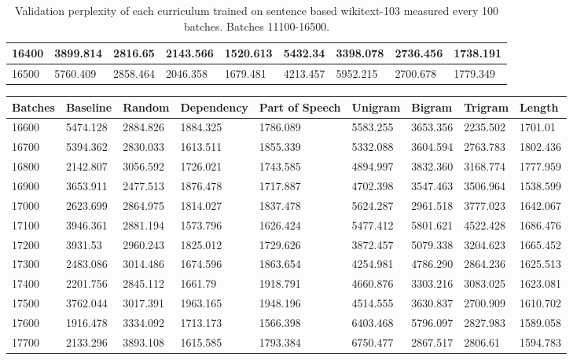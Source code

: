 \documentclass [11pt, proquest] {uwthesis}[2020/12/20]
\begin{document}
\begin{table}[]
\begin{tiny}
\begin{tabular}{|l|l|l|l|l|l|l|l|l|}
16400 & 3899.814 & 2816.65 & 2143.566 & 1520.613 & 5432.34 & 3398.078 & 2736.456 & 1738.191 \\ \hline
16500 & 5760.409 & 2858.464 & 2046.358 & 1679.481 & 4213.457 & 5952.215 & 2700.678 & 1779.349 \\ \hline
\end{tabular}
\end{tiny}
\caption{Validation perplexity of each curriculum trained on sentence based wikitext-103 measured every 100 batches. Batches 11100-16500.}
\label{tab:wikitext-103-sentence-3}
\end{table}
\begin{table}[]
\centering
\begin{tiny}
\begin{tabular}{|l|l|l|l|l|l|l|l|l|}
\hline
Batches & Baseline & Random & Dependency & Part of Speech & Unigram & Bigram & Trigram & Length \\ \hline
16600 & 5474.128 & 2884.826 & 1884.325 & 1786.089 & 5583.255 & 3653.356 & 2235.502 & 1701.01 \\ \hline
16700 & 5394.362 & 2830.033 & 1613.511 & 1855.339 & 5332.088 & 3604.594 & 2763.783 & 1802.436 \\ \hline
16800 & 2142.807 & 3056.592 & 1726.021 & 1743.585 & 4894.997 & 3832.360 & 3168.774 & 1777.959 \\ \hline
16900 & 3653.911 & 2477.513 & 1876.478 & 1717.887 & 4702.398 & 3547.463 & 3506.964 & 1538.599 \\ \hline
17000 & 2623.699 & 2864.975 & 1814.027 & 1837.478 & 5624.287 & 2961.518 & 3777.023 & 1642.067 \\ \hline
17100 & 3946.361 & 2881.194 & 1573.796 & 1626.424 & 5477.412 & 5801.621 & 4522.428 & 1686.476 \\ \hline
17200 & 3931.53 & 2960.243 & 1825.012 & 1729.626 & 3872.457 & 5079.338 & 3204.623 & 1665.452 \\ \hline
17300 & 2483.086 & 3014.486 & 1674.596 & 1863.654 & 4254.981 & 4786.290 & 2864.236 & 1625.513 \\ \hline
17400 & 2201.756 & 2845.112 & 1661.79 & 1918.791 & 4660.876 & 3303.216 & 3083.025 & 1623.081 \\ \hline
17500 & 3762.044 & 3017.391 & 1963.165 & 1948.196 & 4514.555 & 3630.837 & 2700.909 & 1610.702 \\ \hline
17600 & 1916.478 & 3334.092 & 1713.173 & 1566.398 & 6403.468 & 5796.097 & 2827.983 & 1589.058 \\ \hline
17700 & 2133.296 & 3893.108 & 1615.585 & 1793.384 & 6750.477 & 2867.517 & 2806.61 & 1594.783 \\ \hline

\end{tabular}
\end{tiny}
\end{table}
\end{document}
